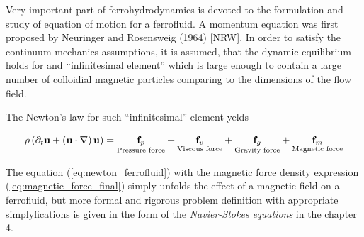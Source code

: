 Very important part of ferrohydrodynamics is devoted to the formulation and study of equation of motion for a ferrofluid. A momentum equation was first proposed by Neuringer and Rosensweig (1964) [NRW]. In order to satisfy the continuum mechanics assumptions, it is assumed, that the dynamic equilibrium holds for and ``infinitesimal element'' which is large enough to contain a large number of colloidial magnetic particles comparing to the dimensions of the flow field.

The Newton's law for such ``infinitesimal'' element yelds

\begin{equation}
\rho \left( \partial_t \mathbf{u} + \left(\mathbf{u} \cdot \nabla\right) \mathbf{u}   \right) = \underset{\text{Pressure force}} {\mathbf{f}_p} + \underset{\text{Viscous force}}{\mathbf{f}_v} + \underset{\text{Gravity force}}{\mathbf{f}_g} + \underset{\text{Magnetic force}}{ \mathbf{f}_m } 
\label{eq:newton_ferrofluid}
\end{equation}

The equation (\ref{eq:newton_ferrofluid}) with the magnetic force density expression (\ref{eq:magnetic_force_final}) simply unfolds the effect of a magnetic field on a ferrofluid, but more formal and rigorous problem definition with appropriate simplyfications is given in the form of the \emph{Navier-Stokes equations} in the chapter 4.
 
